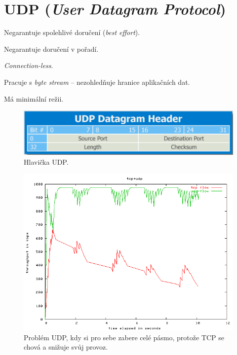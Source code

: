 
\section{UDP (\textit{User Datagram Protocol})}

\begin{compactitem}
    \item Negarantuje spolehlivé doručení (\textit{best effort}).
    \item Negarantuje doručení v pořadí.
    \item \textit{Connection-less}.
    \item Pracuje s \textit{byte stream} -- nezohledňuje hranice aplikačních dat.
    \item Má minimální režii.
\end{compactitem}

\begin{figure}[H]
    \centering
    \includegraphics[width=0.75\linewidth]{udp_header.png}
    \caption{Hlavička UDP.}
\end{figure}

\begin{figure}[H]
    \centering
    \includegraphics[width=1\linewidth]{udp_problem.png}
    \caption{Problém UDP, kdy si pro sebe zabere celé pásmo, protože TCP se chová  a snižuje svůj provoz.}
\end{figure}


